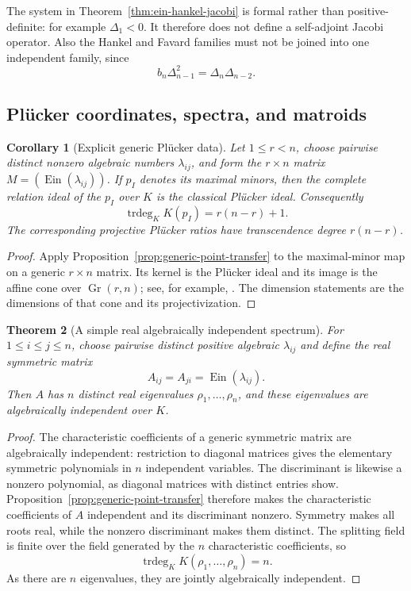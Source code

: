 \documentclass[11pt]{article}
\newtheorem{theorem}{Theorem}[section]
\newtheorem{corollary}[theorem]{Corollary}
\theoremstyle{definition}
\theoremstyle{remark}
\newcommand{\trdeg}{\operatorname{trdeg}}
\newcommand{\Ein}{\operatorname{Ein}}
\begin{document}
The system in Theorem~\ref{thm:ein-hankel-jacobi} is formal rather than
positive-definite: for example $\Delta_1<0$.  It therefore does not define
a self-adjoint Jacobi operator.  Also the Hankel and Favard families must
not be joined into one independent family, since
\begin{equation}\label{eq:hankel-favard-dependence}
 b_n\Delta_{n-1}^2=\Delta_n\Delta_{n-2}.
\end{equation}

\subsection{Pl\"ucker coordinates, spectra, and matroids}

\begin{corollary}[Explicit generic Pl\"ucker data]
\label{cor:ein-pluecker}
Let $1\le r<n$, choose pairwise distinct nonzero algebraic numbers
$\lambda_{ij}$, and form the $r\times n$ matrix
$M=(\Ein(\lambda_{ij}))$.  If $p_I$ denotes its maximal minors, then the
complete relation ideal of the $p_I$ over $K$ is the classical Pl\"ucker
ideal.  Consequently
\[
 \trdeg_K K(p_I)=r(n-r)+1.
\]
The corresponding projective Pl\"ucker ratios have transcendence degree
$r(n-r)$.
\end{corollary}

\begin{proof}
Apply Proposition~\ref{prop:generic-point-transfer} to the maximal-minor
map on a generic $r\times n$ matrix.  Its kernel is the Pl\"ucker ideal and
its image is the affine cone over $\operatorname{Gr}(r,n)$; see, for
example, \cite{BrunsConcaVarbaro2013}.  The dimension statements are the
dimensions of that cone and its projectivization.
\end{proof}

\begin{theorem}[A simple real algebraically independent spectrum]
\label{thm:ein-symmetric-spectrum}
For $1\le i\le j\le n$, choose pairwise distinct positive algebraic
$\lambda_{ij}$ and define the real symmetric matrix
\[
 A_{ij}=A_{ji}=\Ein(\lambda_{ij}).
\]
Then $A$ has $n$ distinct real eigenvalues
$\rho_1,\ldots,\rho_n$, and these eigenvalues are algebraically independent
over $K$.
\end{theorem}

\begin{proof}
The characteristic coefficients of a generic symmetric matrix are
algebraically independent: restriction to diagonal matrices gives the
elementary symmetric polynomials in $n$ independent variables.  The
discriminant is likewise a nonzero polynomial, as diagonal matrices with
distinct entries show.  Proposition~\ref{prop:generic-point-transfer}
therefore makes the characteristic coefficients of $A$ independent and
its discriminant nonzero.  Symmetry makes all roots real, while the
nonzero discriminant makes them distinct.  The splitting field is finite
over the field generated by the $n$ characteristic coefficients, so
\[
 \trdeg_K K(\rho_1,\ldots,\rho_n)=n.
\]
As there are $n$ eigenvalues, they are jointly algebraically independent.
\end{proof}
\end{document}
